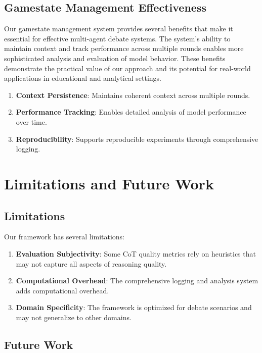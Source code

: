 \documentclass[11pt]{article}
\begin{document}
\subsection{Gamestate Management Effectiveness}

Our gamestate management system provides several benefits that make it essential for effective multi-agent debate systems. The system's ability to maintain context and track performance across multiple rounds enables more sophisticated analysis and evaluation of model behavior. These benefits demonstrate the practical value of our approach and its potential for real-world applications in educational and analytical settings.

\begin{enumerate}
    \item \textbf{Context Persistence}: Maintains coherent context across multiple rounds.
    \item \textbf{Performance Tracking}: Enables detailed analysis of model performance over time.
    \item \textbf{Reproducibility}: Supports reproducible experiments through comprehensive logging.
\end{enumerate}

\section{Limitations and Future Work}

\subsection{Limitations}

Our framework has several limitations:

\begin{enumerate}
    \item \textbf{Evaluation Subjectivity}: Some CoT quality metrics rely on heuristics that may not capture all aspects of reasoning quality.
    \item \textbf{Computational Overhead}: The comprehensive logging and analysis system adds computational overhead.
    \item \textbf{Domain Specificity}: The framework is optimized for debate scenarios and may not generalize to other domains.
\end{enumerate}

\subsection{Future Work}
\end{document}
